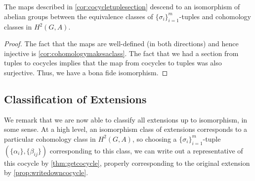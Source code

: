 \documentclass{article}
\numberwithin{equation}{section}
\begin{document}
\begin{theorem} \label{thm:classisomorphism}
	The maps described in \autoref{cor:cocycletuplesection} descend to an isomorphism of abelian groups between the equivalence classes of $\{\sigma_i\}_{i=1}^m$-tuples and cohomology classes in $H^2( G,A)$.
\end{theorem}
\begin{proof}
	The fact that the maps are well-defined (in both directions) and hence injective is \autoref{cor:cohomologymakesaclass}. The fact that we had a section from tuples to cocycles implies that the map from cocycles to tuples was also surjective. Thus, we have a bona fide isomorphism.
\end{proof}

\subsection{Classification of Extensions}
We remark that we are now able to classify all extensions up to isomorphism, in some sense. At a high level, an isomorphism class of extensions corresponds to a particular cohomology class in $H^2( G,A)$, so choosing a $\{\sigma_i\}_{i=1}^m$-tuple $(\{\alpha_i\},\{\beta_{ij}\})$ corresponding to this class, we can write out a representative of this cocycle by \autoref{thm:getcocycle}, properly corresponding to the original extension by \autoref{prop:writedowncocycle}.
\end{document}
